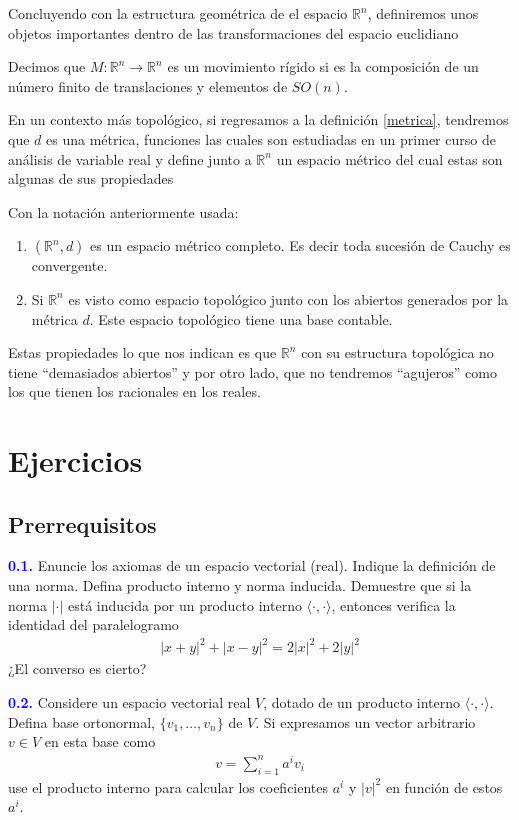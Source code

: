 \documentclass[oneside,11pt]{memoir}
\begin{document}
Concluyendo con la estructura geométrica de el espacio $\mathbb{R}^n$, definiremos unos objetos importantes dentro de las transformaciones del espacio euclidiano 
\begin{definition}
    Decimos que $M:\mathbb{R}^n\to \mathbb{R}^n$ es un movimiento rígido si es la composición de un número finito de translaciones y elementos de $SO(n)$.
\end{definition}

 En un contexto más topológico, si regresamos a la definición \ref{metrica}, tendremos que $d$ es una métrica, funciones las cuales son estudiadas en un primer curso de  análisis de variable real y define junto a $\mathbb{R}^n$ un espacio métrico del cual estas son algunas de sus propiedades
\begin{proposition}
Con la notación anteriormente usada:
    \begin{enumerate}
        \item $(\mathbb{R}^n,d)$ es un espacio métrico completo. Es decir toda sucesión de Cauchy es convergente.
        \item Si $ \mathbb{R}^n$ es visto como espacio topológico junto con los abiertos generados por la métrica $d$. Este espacio topológico tiene una base contable.
    \end{enumerate}
\end{proposition}
Estas propiedades lo que nos indican es que $\mathbb{R}^n$ con su estructura topológica no tiene ``demasiados abiertos'' y por otro lado, que no tendremos ``agujeros'' como los que tienen los racionales en los reales.
\section{Ejercicios}
\subsection{Prerrequisitos}
\textcolor{blue}{\textbf{0.1.}} Enuncie los axiomas de un espacio vectorial (real). Indique la definición de una norma. Defina  producto interno y norma inducida. Demuestre que si la norma $|\cdot|$ está inducida por un producto interno $\langle\cdot,\cdot\rangle$, entonces verifica la identidad del paralelogramo
    \begin{align*}
        |x+y|^2+|x-y|^2=2|x|^2+2|y|^2
    \end{align*}
¿El converso es cierto?

\textcolor{blue}{\textbf{0.2.}} Considere un espacio vectorial real $V$, dotado de un producto interno $\langle\cdot,\cdot\rangle$. Defina base ortonormal, $\{v_1,\ldots,v_n\}$ de $V$. Si expresamos un vector arbitrario $v\in V$ en esta base como
\begin{align*}
    v=\sum_{i=1}^na^iv_i
\end{align*}
use el producto interno para calcular los coeficientes $a^i$ y $|v|^2$ en función de estos $a^i$.
\end{document}
